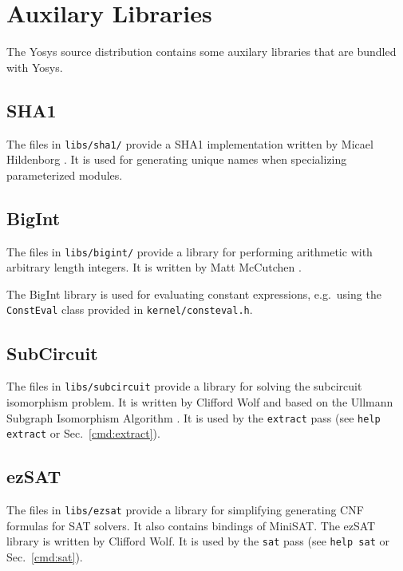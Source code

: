 
\chapter{Auxilary Libraries}

The Yosys source distribution contains some auxilary libraries that are bundled
with Yosys.

\section{SHA1}

The files in {\tt libs/sha1/} provide a SHA1 implementation written by Micael
Hildenborg . It is used for generating unique names when
specializing parameterized modules.

\section{BigInt}

The files in {\tt libs/bigint/} provide a library for performing arithmetic with
arbitrary length integers. It is written by Matt McCutchen .

The BigInt library is used for evaluating constant expressions, e.g.~using the {\tt
ConstEval} class provided in {\tt kernel/consteval.h}.

\section{SubCircuit}
\label{sec:SubCircuit}

The files in {\tt libs/subcircuit} provide a library for solving the subcircuit
isomorphism problem. It is written by Clifford Wolf and based on the Ullmann
Subgraph Isomorphism Algorithm \cite{UllmannSubgraphIsomorphism}. It is used by
the {\tt extract} pass (see {\tt help extract} or Sec.~\ref{cmd:extract}).

\section{ezSAT}

The files in {\tt libs/ezsat} provide a library for simplifying generating CNF
formulas for SAT solvers. It also contains bindings of MiniSAT. The ezSAT
library is written by Clifford Wolf. It is used by the {\tt sat} pass (see
{\tt help sat} or Sec.~\ref{cmd:sat}).

